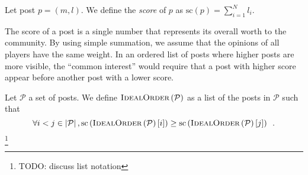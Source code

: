     \begin{definition}
      Let post $p = \left(m, l\right)$. We define the \emph{score} of $p$ as
      $\mathrm{sc}\left(p\right) = \sum\limits_{i = 1}^N l_i$.
    \end{definition}
    The score of a post is a single number that represents its overall worth to
    the community. By using simple summation, we assume that the opinions of all
    players have the same weight. In an ordered list of posts where higher posts
    are more visible, the ``common interest'' would require that a post with
    higher score appear before another post with a lower score.

    \begin{definition}
      Let $\mathcal{P}$ a set of posts. We define
      $\textsc{IdealOrder}\left(\mathcal{P}\right)$ as a list of the posts in
      $\mathcal{P}$ such that
      \begin{equation*}
        \forall i < j \in \left|\mathcal{P}\right|,
        \mathrm{sc}\left(\textsc{IdealOrder}
        \left(\mathcal{P}\right)\left[i\right]\right) \geq
        \mathrm{sc}\left(\textsc{IdealOrder}
        \left(\mathcal{P}\right)\left[j\right]\right) \enspace.
      \end{equation*}\footnote{TODO: discuss list notation}
    \end{definition}

